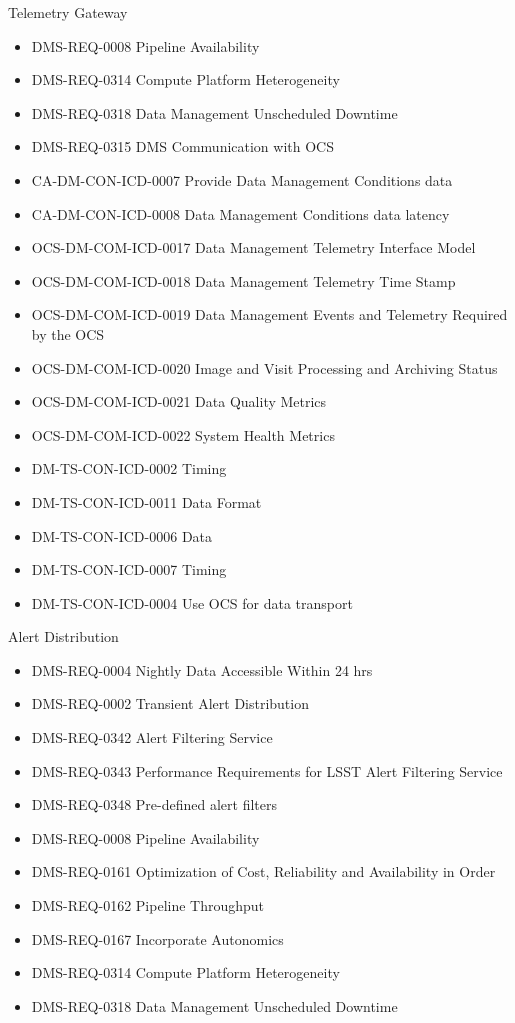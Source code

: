 Telemetry Gateway \begin{itemize}
\item DMS-REQ-0008 Pipeline Availability
\item DMS-REQ-0314 Compute Platform Heterogeneity
\item DMS-REQ-0318 Data Management Unscheduled Downtime
\item DMS-REQ-0315 DMS Communication with OCS
\item CA-DM-CON-ICD-0007 Provide Data Management Conditions data
\item CA-DM-CON-ICD-0008 Data Management Conditions data latency
\item OCS-DM-COM-ICD-0017 Data Management Telemetry Interface Model
\item OCS-DM-COM-ICD-0018 Data Management Telemetry Time Stamp
\item OCS-DM-COM-ICD-0019 Data Management Events and Telemetry Required by the OCS
\item OCS-DM-COM-ICD-0020 Image and Visit Processing and Archiving Status
\item OCS-DM-COM-ICD-0021 Data Quality Metrics
\item OCS-DM-COM-ICD-0022 System Health Metrics
\item DM-TS-CON-ICD-0002 Timing
\item DM-TS-CON-ICD-0011 Data Format
\item DM-TS-CON-ICD-0006 Data
\item DM-TS-CON-ICD-0007 Timing
\item DM-TS-CON-ICD-0004 Use OCS for data transport
\end{itemize}
Alert Distribution \begin{itemize}
\item DMS-REQ-0004 Nightly Data Accessible Within 24 hrs
\item DMS-REQ-0002 Transient Alert Distribution
\item DMS-REQ-0342 Alert Filtering Service
\item DMS-REQ-0343 Performance Requirements for LSST Alert Filtering Service
\item DMS-REQ-0348 Pre-defined alert filters
\item DMS-REQ-0008 Pipeline Availability
\item DMS-REQ-0161 Optimization of Cost, Reliability and Availability in Order
\item DMS-REQ-0162 Pipeline Throughput
\item DMS-REQ-0167 Incorporate Autonomics
\item DMS-REQ-0314 Compute Platform Heterogeneity
\item DMS-REQ-0318 Data Management Unscheduled Downtime
\end{itemize}
